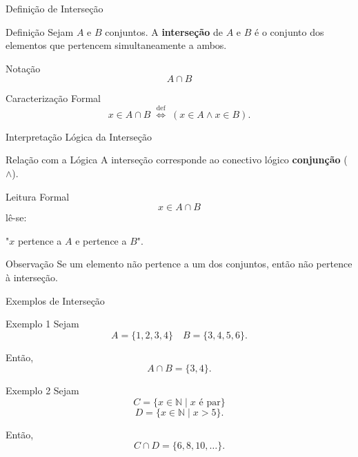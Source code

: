 \documentclass[9pt]{beamer}
\begin{document}
\begin{frame}{Definição de Interseção} 

\begin{block}{Definição}
Sejam $A$ e $B$ conjuntos.  
A \textbf{interseção} de $A$ e $B$ é o conjunto dos elementos
que pertencem simultaneamente a ambos.
\end{block}

\begin{block}{Notação}
\[
A \cap B
\]
\end{block}

\begin{block}{Caracterização Formal}
\[
x \in A \cap B
\;\stackrel{\text{def}}{\Longleftrightarrow}\;
(x \in A \land x \in B).
\]
\end{block}

\end{frame}
\begin{frame}{Interpretação Lógica da Interseção}

\begin{block}{Relação com a Lógica}
A interseção corresponde ao conectivo lógico
\textbf{conjunção} ($\land$).
\end{block}

\begin{block}{Leitura Formal}
\[
x \in A \cap B
\]
lê-se:
\begin{center}
"$x$ pertence a $A$ e pertence a $B$".
\end{center}
\end{block}

\begin{block}{Observação}
Se um elemento não pertence a um dos conjuntos,
então não pertence à interseção.
\end{block}

\end{frame}
\begin{frame}{Exemplos de Interseção}

\begin{block}{Exemplo 1}
Sejam
\[
A = \{1,2,3,4\}
\quad
B = \{3,4,5,6\}.
\]

Então,
\[
A \cap B = \{3,4\}.
\]
\end{block}

\begin{block}{Exemplo 2}
Sejam
\[
C = \{ x \in \mathbb{N} \mid x \text{ é par} \}
\]
\[
D = \{ x \in \mathbb{N} \mid x > 5 \}.
\]

Então,
\[
C \cap D = \{6,8,10,\dots\}.
\]
\end{block}

\end{frame}
\end{document}
